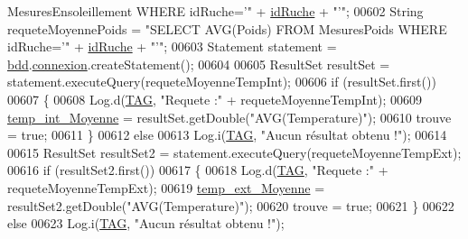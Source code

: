 \begin{DoxyCode}
{       MesuresEnsoleillement WHERE idRuche='"} + \hyperlink{classfr_1_1campus_1_1laurainc_1_1honeybee_1_1_ruche_aee4d51dd1634b799427d89e168cdadf4}{idRuche} + \textcolor{stringliteral}{"'"};
00602                         String requeteMoyennePoids = \textcolor{stringliteral}{"SELECT AVG(Poids) FROM MesuresPoids WHERE  idRuche='"}
       + \hyperlink{classfr_1_1campus_1_1laurainc_1_1honeybee_1_1_ruche_aee4d51dd1634b799427d89e168cdadf4}{idRuche} + \textcolor{stringliteral}{"'"};
00603                         Statement statement = \hyperlink{classfr_1_1campus_1_1laurainc_1_1honeybee_1_1_ruche_a0eb43a2b63fb83e9d5af6cd6b754c7da}{bdd}.\hyperlink{classfr_1_1campus_1_1laurainc_1_1honeybee_1_1_base_de_donnees_a358899633f17b8cd00dd2c4cfdd40abe}{connexion}.createStatement();
00604 
00605                         ResultSet resultSet = statement.executeQuery(requeteMoyenneTempInt);
00606                         \textcolor{keywordflow}{if} (resultSet.first())
00607                         \{
00608                             Log.d(\hyperlink{classfr_1_1campus_1_1laurainc_1_1honeybee_1_1_ruche_a44739cbb0fa7451c1edc240a3f51c257}{TAG}, \textcolor{stringliteral}{"Requete :"} + requeteMoyenneTempInt);
00609                             \hyperlink{classfr_1_1campus_1_1laurainc_1_1honeybee_1_1_ruche_a99bf4c97fe3710861e0a730cc0010bfb}{temp\_int\_Moyenne} = resultSet.getDouble(\textcolor{stringliteral}{"AVG(Temperature)"});
00610                             trouve = \textcolor{keyword}{true};
00611                         \}
00612                         \textcolor{keywordflow}{else}
00613                             Log.i(\hyperlink{classfr_1_1campus_1_1laurainc_1_1honeybee_1_1_ruche_a44739cbb0fa7451c1edc240a3f51c257}{TAG}, \textcolor{stringliteral}{"Aucun résultat obtenu !"});
00614 
00615                         ResultSet resultSet2 = statement.executeQuery(requeteMoyenneTempExt);
00616                         \textcolor{keywordflow}{if} (resultSet2.first())
00617                         \{
00618                             Log.d(\hyperlink{classfr_1_1campus_1_1laurainc_1_1honeybee_1_1_ruche_a44739cbb0fa7451c1edc240a3f51c257}{TAG}, \textcolor{stringliteral}{"Requete :"} + requeteMoyenneTempExt);
00619                             \hyperlink{classfr_1_1campus_1_1laurainc_1_1honeybee_1_1_ruche_a254c5bb0927e07aebb85c811560eff98}{temp\_ext\_Moyenne} = resultSet2.getDouble(\textcolor{stringliteral}{"AVG(Temperature)"});
00620                             trouve = \textcolor{keyword}{true};
00621                         \}
00622                         \textcolor{keywordflow}{else}
00623                             Log.i(\hyperlink{classfr_1_1campus_1_1laurainc_1_1honeybee_1_1_ruche_a44739cbb0fa7451c1edc240a3f51c257}{TAG}, \textcolor{stringliteral}{"Aucun résultat obtenu !"});

\end{DoxyCode}
